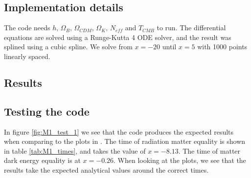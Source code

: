 \documentclass{aa}
\begin{document}
\subsection{Implementation details}
The code needs $h$, $\Omega_B$, $\Omega_{CDM}$, $\Omega_K$, $N_{eff}$ and $T_{CMB}$ to run. 
The differential equations are solved using a Runge-Kutta 4 ODE solver, and the result was splined using a cubic spline.
We solve from $x=-20$ until $x=5$ with 1000 points linearly spaced.

\subsection{Results}

\subsection{Testing the code}
In figure \ref{fig:M1_test_1} we see that the code produces the expected results when comparing to the plots in \cite{winther:2023}. The time of radiation matter equality is
shown in table \ref{tab:M1_times}, and takes the value of $x=-8.13$. The time of matter dark energy equality is at $x = -0.26$. When looking at the plots, we see that 
the results take the expected analytical values around the correct times.  
\end{document}
